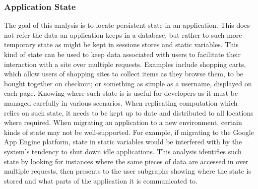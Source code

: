 \documentclass[msc,oneside]{ubcthesis}
\begin{document}
%
%

\subsubsection{Application State}
The goal of this analysis is to locate persistent state in an application. This does not refer the data an application keeps in a database, but rather to such more temporary state as might be kept in sessions stores and static variables. This kind of state can be used to keep data associated with users to facilitate their interaction with a site over multiple requests. Examples include shopping carts, which allow users of shopping sites to collect items as they browse them, to be bought together on checkout; or something as simple as a username, displayed on each page. Knowing where such state is is useful for developers as it must be managed carefully in various scenarios. When replicating computation which relies on such state, it needs to be kept up to date and distributed to all locations where required. When migrating an application to a new environment, certain kinds of state may not be well-supported. For example, if migrating to the Google App Engine platform, state in static variables would be interfered with by the system's tendency to shut down idle applications. This analysis identifies such state by looking for instances where the same pieces of data are accessed in over multiple requests, then presents to the user subgraphs showing where the state is stored and what parts of the application it is communicated to.\\
\end{document}
